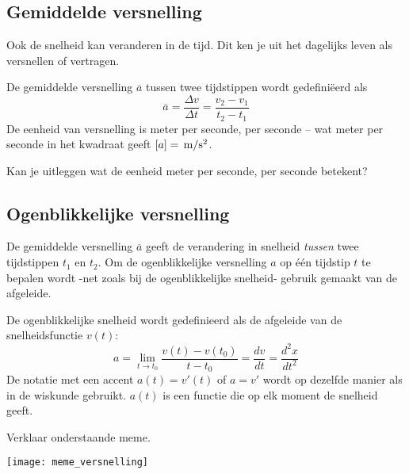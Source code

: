 \documentclass{ximera}
\begin{document}
	\author{Bart Lambregs}
    \xmsource\xmuitleg


\subsection*{Gemiddelde versnelling}

Ook de snelheid kan veranderen in de tijd. Dit ken je uit het dagelijks leven als versnellen of vertragen.

\begin{definition}

De gemiddelde versnelling \(\overline{a}\) tussen twee tijdstippen wordt gedefiniëerd als
\[
\overline{a}=\frac{\Delta v}{\Delta t}=\frac{v_2-v_1}{t_2-t_1}
\]
De eenheid van versnelling is meter per seconde, per seconde -- wat meter per seconde in het kwadraat geeft $[a]=\rm\,m/s^2$.
\end{definition}

\begin{denkvraag*}{}
Kan je uitleggen wat de eenheid meter per seconde, per seconde betekent? 
\end{denkvraag*}

\subsection*{Ogenblikkelijke versnelling}

De gemiddelde versnelling \(\overline{a}\) geeft de verandering in snelheid \textit{tussen} twee tijdstippen \(t_1\) en \(t_2\).  Om de ogenblikkelijke versnelling \(a\) op één tijdstip \(t\) te bepalen wordt -net zoals bij de ogenblikkelijke snelheid- gebruik gemaakt van de afgeleide. 

\begin{definition}
De ogenblikkelijke snelheid wordt gedefinieerd als de afgeleide van de snelheidsfunctie \(v(t)\):
\[
a=\lim_{t\to t_0}\frac{v(t)-v(t_0)}{t-t_0} = \frac{dv}{dt}=\frac{d^2x}{dt^2}
\]
De notatie met een accent $a(t)=v'(t)$ of $a=v'$ wordt op dezelfde manier als in de wiskunde gebruikt. $a(t)$ is een functie die op elk moment de snelheid geeft. 
\end{definition}

\begin{exercise}
Verklaar onderstaande meme. 
\begin{image}
\texttt{[image: meme\_versnelling]}
\end{image}

\end{exercise}
	
\end{document}
